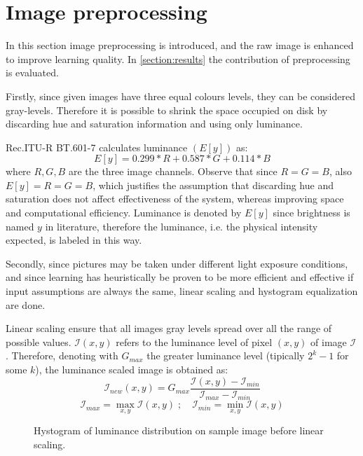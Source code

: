 \section{Image preprocessing}\label{section:image_preprocessing}
    \par{
        In this section image preprocessing is introduced, and the raw image is enhanced to improve learning quality. In \ref{section:results} the contribution of preprocessing is evaluated.
    }
    \par{
        Firstly, since given images have three equal colours levels, they can be considered gray-levels. Therefore it is possible to shrink the space occupied on disk by discarding hue and saturation information and using only luminance.
    }
    \par{
        Rec.ITU-R BT.601-7 calculates luminance $\left(E\left[y\right]\right)$ as:
        $$ E\left[y\right] = 0.299 * R + 0.587 * G + 0.114 * B $$
        where $R,G,B$ are the three image channels. Observe that since $R = G = B$, also $E\left[y\right] = R = G = B$, which justifies the assumption that discarding hue and saturation does not affect effectiveness of the system, whereas improving space and computational efficiency. Luminance is denoted by $E\left[y\right]$ since brightness is named $y$ in literature, therefore the luminance, i.e. the physical intensity expected, is labeled in this way.
    }
    \par{
        Secondly, since pictures may be taken under different light exposure conditions, and since learning has heuristically be proven to be more efficient and effective if input assumptions are always the same, linear scaling and hystogram equalization are done.
    }
    \par{
        Linear scaling ensure that all images gray levels spread over all the range of possible values. $\mathcal{I}\left(x,y\right)$ refers to the luminance level of pixel $\left(x,y\right)$ of image $\mathcal{I}$. Therefore, denoting with $G_{max}$ the greater luminance level (tipically $2^k - 1$ for some $k$), the luminance scaled image is obtained as:
        $$\mathcal{I}_{new}\left(x,y\right) = G_{max} \frac{\mathcal{I}\left(x,y\right) - \mathcal{I}_{min}}{\mathcal{I}_{max} - \mathcal{I}_{min}}$$
        $$\mathcal{I}_{max} = \max_{x,y} \mathcal{I}\left(x,y\right)\;;\quad\mathcal{I}_{min} = \min_{x,y} \mathcal{I}\left(x,y\right)$$
    }
    \begin{figure}
        \caption{Hystogram of luminance distribution on sample image before linear scaling.}\label{fig:luminance_before}
    \end{figure}
